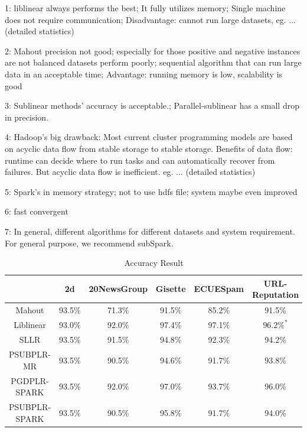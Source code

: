 \documentclass{llncs}
\begin{document}
1: liblinear always performs the best; It fully utilizes memory; Single machine does not require communication; Disadvantage: cannot run large datasets, eg. ...(detailed statistics)

2: Mahout precision not good; especially for those positive and negative instances are not balanced datasets perform poorly; sequential algorithm that can run large data in an acceptable time; Advantage: running memory is low, scalability is good

3: Sublinear methods' accuracy is acceptable.; Parallel-sublinear has a small drop in precision.

4: Hadoop's big drawback: Most current cluster programming models are based on acyclic data flow from stable storage to stable storage. Benefits of data flow: runtime can decide where to run tasks and can automatically recover from failures. But acyclic data flow is inefficient. eg. ... (detailed statistics)

5: Spark's in memory strategy; not to use hdfs file; system maybe even improved

6: fast convergent

7: In general, different algorithms for different datasets and system requirement. For general purpose, we recommend subSpark.

\begin{table}[h]
\centering
\caption{Accuracy Result}\label{tab:table3}
\begin{tabular}{|c|c|c|c|c|c|}
\hline
           & 2d   & 20NewsGroup & Gisette & ECUESpam & URL-Reputation \\
\hline
Mahout     & 93.5\% & 71.3\% & 91.5\% & 85.2\% & 91.5\% \\
\hline
Liblinear  & 93.0\% & 92.0\% & 97.4\% & 97.1\% & $96.2\%^*$ \\
\hline
SLLR       & 93.5\% & 91.5\% & 94.8\% & 92.3\% & 94.2\% \\
\hline
PSUBPLR-MR & 93.5\% & 90.5\% & 94.6\% & 91.7\% & 93.8\% \\
\hline
PGDPLR-SPARK & 93.5\% & 92.0\% & 97.0\% & 93.7\% & 96.0\% \\
\hline
PSUBPLR-SPARK & 93.5\% & 90.5\% & 95.8\% & 91.7\% & 94.0\% \\
\hline
\end{tabular}
\end{table}
\end{document}
